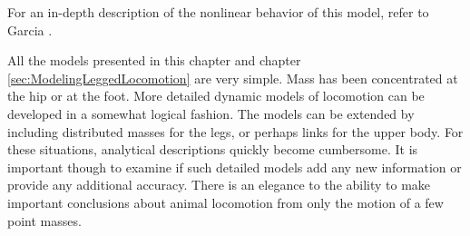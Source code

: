 For an in-depth description of the nonlinear behavior of this model, 
refer to Garcia \cite{garcia97}.




All the models presented in this chapter and chapter \ref{sec:ModelingLeggedLocomotion} are very simple. Mass has been concentrated at the hip or at the foot. More detailed dynamic models of locomotion can be developed in a somewhat logical fashion. The models can be extended by including distributed masses for the legs, or perhaps links for the upper body. For these situations, analytical descriptions quickly become cumbersome. It is important though to examine if such detailed models add any new information or provide any additional accuracy. There is an elegance to the ability to make important conclusions about animal locomotion from only the motion of a few point masses.

